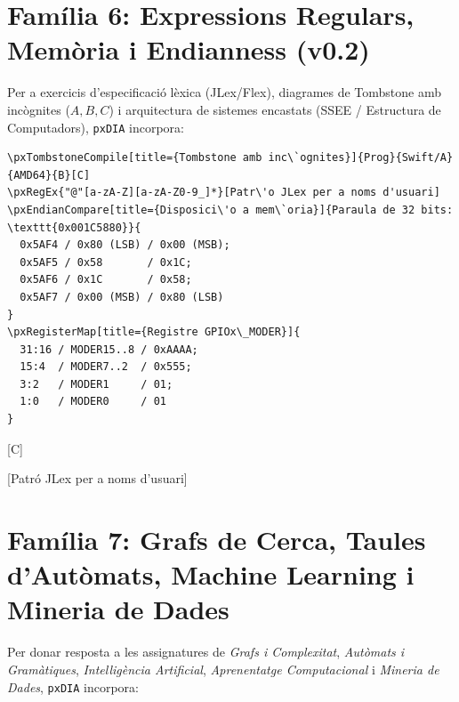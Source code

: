 \documentclass[11pt,a4paper]{article}
\begin{document}

\section{Fam\'ilia 6: Expressions Regulars, Mem\`oria i Endianness (v0.2)}

Per a exercicis d'especificaci\'o l\`exica (JLex/Flex), diagrames de Tombstone amb inc\`ognites ($A, B, C$) i arquitectura de sistemes encastats (SSEE / Estructura de Computadors), \texttt{pxDIA} incorpora:

\begin{verbatim}
\pxTombstoneCompile[title={Tombstone amb inc\`ognites}]{Prog}{Swift/A}{AMD64}{B}[C]
\pxRegEx{"@"[a-zA-Z][a-zA-Z0-9_]*}[Patr\'o JLex per a noms d'usuari]
\pxEndianCompare[title={Disposici\'o a mem\`oria}]{Paraula de 32 bits: \texttt{0x001C5880}}{
  0x5AF4 / 0x80 (LSB) / 0x00 (MSB);
  0x5AF5 / 0x58       / 0x1C;
  0x5AF6 / 0x1C       / 0x58;
  0x5AF7 / 0x00 (MSB) / 0x80 (LSB)
}
\pxRegisterMap[title={Registre GPIOx\_MODER}]{
  31:16 / MODER15..8 / 0xAAAA;
  15:4  / MODER7..2  / 0x555;
  3:2   / MODER1     / 01;
  1:0   / MODER0     / 01
}
\end{verbatim}

[C]

[Patr\'o JLex per a noms d'usuari]



\newpage
\section{Fam\'ilia 7: Grafs de Cerca, Taules d'Aut\`omats, Machine Learning i Mineria de Dades}

Per donar resposta a les assignatures de \emph{Grafs i Complexitat}, \emph{Aut\`omats i Gram\`atiques}, \emph{Intel\textperiodcentered lig\`encia Artificial}, \emph{Aprenentatge Computacional} i \emph{Mineria de Dades}, \texttt{pxDIA} incorpora:
\end{document}
